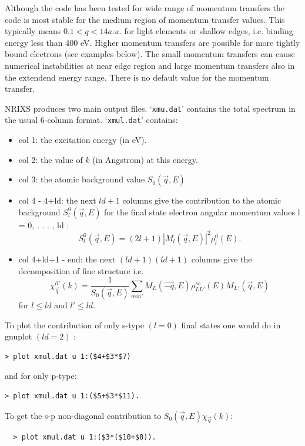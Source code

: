 \documentclass[11pt,oneside]{report} %
\newcommand{\file}[1]{`\texttt{#1}'}
\begin{document}
Although the code has been tested for wide range of momentum transfers the code is most
stable for the medium region of momentum transfer values. This typically means $0.1 < q <
14 a.u.$ for light elements or shallow edges, i.e. binding energy less than 400 eV. Higher
momentum transfers are possible for more tightly bound electrons (see examples below). The
small momentum transfers can cause numerical instabilities at near edge region and large
momentum transfers also in the extendend energy range. There is no default value for the
momentum transfer.

NRIXS produces two main output files.  \file{xmu.dat} contains the total spectrum in the usual 6-column format.  \file{xmul.dat} contains:
\begin{itemize}
\item col 1:  the excitation energy (in eV).
\item col 2:  the value of $k$ (in Angstrom) at this energy.
\item col 3:  the atomic background value $S_0(\vec{q},E)$
\item col 4 - 4+ld:  the next $ld+1$ columns give the contribution to the atomic background $S_l^0(\vec{q},E)$ for the final
state electron angular momentum values l = 0, . . . , ld :
\begin{equation} \label{nrixseq1}
S_l^0(\vec{q},E) = (2l + 1) |M_l(\vec{q},E)|^2 \rho_{l}^0 (E).
\end{equation}
\item col 4+ld+1 - end:  the next $(ld+1)  (ld+1)$ columns give the decomposition of fine structure i.e.
\begin{equation} \label{nrixseq2}
\chi_{\vec{q}}^{ll'}(k) = \frac {1} {S_0(\vec{q},E)} \sum_{mm'} {M_L(\vec{-q},E)\rho_{LL'}^{sc}(E)M_{L'}(\vec{q},E)}
\end{equation}
for $l \leq ld$ and $l' \leq ld$.
\end{itemize}

To plot the contribution of only s-type $(l = 0)$ final states one would do in gnuplot $(ld = 2)$ :
\begin{verbatim}
> plot xmul.dat u 1:($4+$3*$7)
\end{verbatim}
and for only p-type:
\begin{verbatim}
> plot xmul.dat u 1:($5+$3*$11).
\end{verbatim}
To get the s-p non-diagonal contribution to $S_0(\vec{q},E) \chi_{\vec{q}}(k)$:
\begin{verbatim}
  > plot xmul.dat u 1:($3*($10+$8)). 
\end{verbatim}
\end{document}
